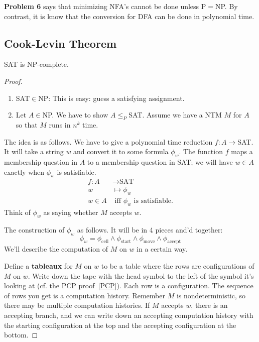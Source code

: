 \textbf{Problem 6} says that minimizing NFA's cannot be done unless P$=$NP. %
By contrast, it is know that the conversion for DFA can be done in polynomial time. %

\subsection{Cook-Levin Theorem}
\begin{thm}
SAT is NP-complete.
\end{thm}
\begin{proof}$\,$
\begin{enumerate}
\item
SAT$\in$NP: This is easy: guess a satisfying assignment.
\item
Let $A\in $NP. We have to show $A\le_P$SAT. Assume we have a  NTM $M$ for $A$ so that $M$ runs in $n^k$ time.
\end{enumerate}
The idea is as follows. We have to give a polynomial time reduction $f:A\to $SAT. It will take a string $w$ and convert it to some formula $\phi_w$.
The function $f$ maps a membership question in $A$ to a membership question in SAT; we will have $w\in A$ exactly when $\phi_w$ is satisfiable. 
\begin{align*}
f:A&\to \text{SAT}\\
w&\mapsto \phi_w\\
w\in A& \text{ iff $\phi_w$ is satisfiable}.
\end{align*}
Think of $\phi_w$ as saying whether $M$ accepts $w$. 

The construction of $\phi_w$ as follows. It will be in 4 pieces and'd together:
\[
\phi_w=\phi_{\text{cell}}\wedge \phi_{\text{start}}\wedge \phi_{\text{move}}\wedge\phi_{\text{accept}}
\]
We'll describe the computation of $M$ %
on $w$ in a certain way.

Define a \textbf{tableaux} for $M$ on $w$ to be a table where the rows are configurations of $M$ on $w$. Write down the tape with the head symbol to the left of the symbol it's looking at (cf. the PCP proof~\ref{PCP}). Each row is a configuration. The sequence of rows you get is a computation history. Remember $M$ is nondeterministic, so there may be multiple computation histories. If $M$ accepts $w$, there is an accepting branch, and we can write down an accepting computation history with the starting configuration at the top and the accepting configuration at the bottom. 


\end{proof}

